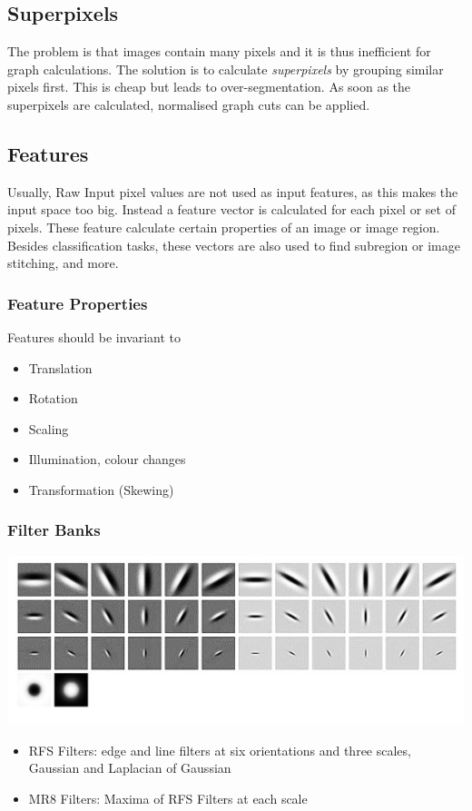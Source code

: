 \subsection{Superpixels}
The problem is that images contain many pixels and it is thus inefficient for graph calculations.
The solution is to calculate \emph{superpixels} by grouping similar pixels first.
This is cheap but leads to over-segmentation. As soon as the superpixels are calculated, normalised graph cuts can be applied.

\subsection{Features}
Usually, Raw Input pixel values are not used as input features, as this makes the input space too big.
Instead a feature vector is calculated for each pixel or set of pixels.
These feature calculate certain properties of an image or image region.
Besides classification tasks, these vectors are also used to find subregion or image stitching, and more.

\subsubsection{Feature Properties}
Features should be invariant to
\begin{itemize}[label=-]
	\item Translation
	\item Rotation
	\item Scaling
	\item Illumination, colour changes
	\item Transformation (Skewing)
\end{itemize}

\subsubsection{Filter Banks}
\begin{center}
	\includegraphics[width=0.6\linewidth]{img/filter_bank}
\end{center}
\begin{itemize}
	\item RFS Filters: edge and line filters at six orientations and three scales, Gaussian and Laplacian of Gaussian
	\item MR8 Filters: Maxima of RFS Filters at each scale
\end{itemize}

